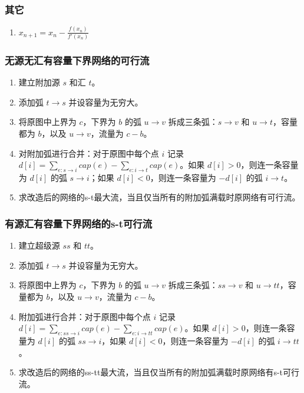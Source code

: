 \subsubsection{其它}

\begin{enumerate}

\item $x_{n+1}=x_{n}-\frac{f(x_{n})}{f'(x_{n})}$

\end{enumerate}

\subsubsection{无源无汇有容量下界网络的可行流}

\begin{enumerate}

\item 建立附加源 $s$ 和汇 $t$。

\item 添加弧 $t\to s$ 并设容量为无穷大。

\item 将原图中上界为 $c$，下界为 $b$ 的弧 $u\to v$ 拆成三条弧：$s\to v$ 和 $u \to t$，容量都为 $b$，以及 $u\to v$，流量为 $c-b$。

\item 对附加弧进行合并：对于原图中每个点 $i$ 记录 $d[i]=\sum\limits_{e:s\to i} cap(e) - \sum\limits_{e:i\to t} cap(e)$。如果 $d[i]>0$，则连一条容量为 $d[i]$ 的弧 $s\to i$；如果 $d[i]<0$，则连一条容量为 $-d[i]$ 的弧 $i\to t$。

\item 求改造后的网络的s-t最大流，当且仅当所有的附加弧满载时原网络有可行流。

\end{enumerate}

\subsubsection{有源汇有容量下界网络的s-t可行流}

\begin{enumerate}

\item 建立超级源 $ss$ 和 $tt$。

\item 添加弧 $t\to s$ 并设容量为无穷大。

\item 将原图中上界为 $c$，下界为 $b$ 的弧 $u\to v$ 拆成三条弧：$ss\to v$ 和 $u \to tt$，容量都为 $b$，以及 $u\to v$，流量为 $c-b$。

\item 附加弧进行合并：对于原图中每个点 $i$ 记录 $d[i]=\sum\limits_{e:ss\to i} cap(e) - \sum\limits_{e:i\to tt} cap(e)$。如果 $d[i]>0$，则连一条容量为 $d[i]$ 的弧 $ss\to i$，如果 $d[i]<0$，则连一条容量为 $-d[i]$ 的弧 $i\to tt$。

\item 求改造后的网络的ss-tt最大流，当且仅当所有的附加弧满载时原网络有s-t可行流。

\end{enumerate}

